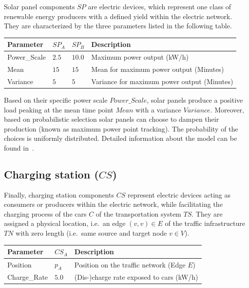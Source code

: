Solar panel components $SP$ are electric devices, which represent one class of renewable energy producers with a defined yield within the electric network. They are characterized by the three parameters listed in the following table.

\begin{table}[h]
	\renewcommand{\arraystretch}{1.3}
	\centering
	\begin{tabularx}{\columnwidth}{lllX}
		\hline
		\textbf{Parameter}                     & \textbf{$SP_{A}$} & \textbf{$SP_{B}$} & \textbf{Description} \\ \hline
		Power\_Scale                       	   & $2.5$ & $10.0$ & Maximum power output (kW/h) \\
		Mean                       	  		  & $15$ & $15$ & Mean for maximum power output (Minutes) \\
		Variance                       	       & $5$ & $5$ & Variance for maximum power output (Minutes) \\ \hline
	\end{tabularx}
\end{table}

Based on their specific power scale $Power\_Scale$, solar panels produce a positive load peaking at the mean time point $Mean$ with a variance $Variance$. Moreover, based on probabilistic selection solar panels can choose to dampen their production (known as maximum power point tracking). The probability of the choices is uniformly distributed. Detailed information about the model can be found in~\cite{hackenberg2014rapid}.

\subsection{Charging station ($CS$)}
\label{section:charging_station}

Finally, charging station components $CS$ represent electric devices acting as consumers or producers within the electric network, while facilitating the charging process of the cars $C$ of the transportation system $TS$. They are assigned a physical location, i.e.\ an edge $(v,v) \in E$ of the traffic infrastructure $TN$ with zero length (i.e.\ same source and target node $v \in V$). 

\begin{table}[h]
	\renewcommand{\arraystretch}{1.3}
	\centering
	\begin{tabularx}{\columnwidth}{llX}
		\hline
		\textbf{Parameter}      & \textbf{$CS_{A}$} & \textbf{Description} \\ \hline
		Position      			& $p_A$ & Position on the traffic network (Edge $E$) \\  
		Charge\_Rate        	& $5.0$ & (Dis-)charge rate exposed to cars (kW/h)     \\ \hline
	\end{tabularx}
\end{table}

